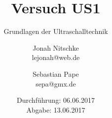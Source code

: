 

\title{Versuch US1}
\subtitle{Grundlagen der Ultraschalltechnik}
\author{Jonah Nitschke\\
        lejonah@web.de \and
        Sebastian Pape\\
        sepa@gmx.de}
\date{Durchführung: 06.06.2017\\
      Abgabe: 13.06.2017}



\maketitle
\newpage
\setcounter{page}{1}


\newpage


\newpage

\printbibliography


